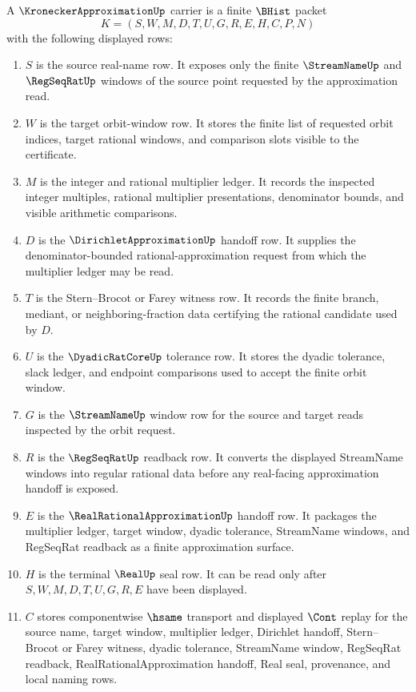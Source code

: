 \begin{definition}\label{def:kronecker-approximation-carrier}
A $\KroneckerApproximationUp$ carrier is a finite $\BHist$ packet
$$
K=(S,W,M,D,T,U,G,R,E,H,C,P,N)
$$
with the following displayed rows:
\begin{enumerate}
\item $S$ is the source real-name row. It exposes only the finite $\StreamNameUp$ and $\RegSeqRatUp$ windows of the source point requested by the approximation read.
\item $W$ is the target orbit-window row. It stores the finite list of requested orbit indices, target rational windows, and comparison slots visible to the certificate.
\item $M$ is the integer and rational multiplier ledger. It records the inspected integer multiples, rational multiplier presentations, denominator bounds, and visible arithmetic comparisons.
\item $D$ is the $\DirichletApproximationUp$ handoff row. It supplies the denominator-bounded rational-approximation request from which the multiplier ledger may be read.
\item $T$ is the Stern--Brocot or Farey witness row. It records the finite branch, mediant, or neighboring-fraction data certifying the rational candidate used by $D$.
\item $U$ is the $\DyadicRatCoreUp$ tolerance row. It stores the dyadic tolerance, slack ledger, and endpoint comparisons used to accept the finite orbit window.
\item $G$ is the $\StreamNameUp$ window row for the source and target reads inspected by the orbit request.
\item $R$ is the $\RegSeqRatUp$ readback row. It converts the displayed StreamName windows into regular rational data before any real-facing approximation handoff is exposed.
\item $E$ is the $\RealRationalApproximationUp$ handoff row. It packages the multiplier ledger, target window, dyadic tolerance, StreamName windows, and RegSeqRat readback as a finite approximation surface.
\item $H$ is the terminal $\RealUp$ seal row. It can be read only after $S,W,M,D,T,U,G,R,E$ have been displayed.
\item $C$ stores componentwise $\hsame$ transport and displayed $\Cont$ replay for the source name, target window, multiplier ledger, Dirichlet handoff, Stern--Brocot or Farey witness, dyadic tolerance, StreamName window, RegSeqRat readback, RealRationalApproximation handoff, Real seal, provenance, and local naming rows.

\end{enumerate}
\end{definition}

